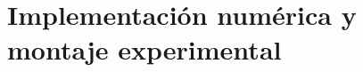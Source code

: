 \documentclass[aspectratio=169,9pt]{beamer}
\begin{document}
\section{Implementaci\'on num\'erica y montaje experimental}


\end{document}
